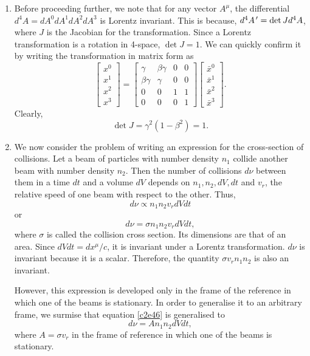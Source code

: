\begin{enumerate}
\item Before proceeding further, we note that for any vector $A^\mu$, the differential
$d^4A = dA^0dA^1dA^2dA^3$ is Lorentz invariant. This is because, $d^4A^{\,\prime} = 
\det J  d^4A$, where $J$ is the Jacobian for the transformation. Since a Lorentz
transformation is a rotation in 4-space, $\det J = 1$. We can quickly confirm it
by writing the transformation in matrix form as
\[
\begin{bmatrix}x^0 \\ x^1 \\ x^2 \\ x^3\end{bmatrix} = 
\begin{bmatrix} \gamma & \beta\gamma & 0 & 0 \\
\beta\gamma & \gamma & 0 & 0 \\
0 & 0 & 1 & 1 \\
0 & 0 & 0 & 1\end{bmatrix}
\begin{bmatrix}\bar{x}^0 \\ \bar{x}^1 \\ \bar{x}^2 \\ \bar{x}^3\end{bmatrix}.
\]
Clearly,
\[
\det J = \gamma^2(1 - \beta^2) = 1.
\]

\item We now consider the problem of writing an expression for the cross-section
of collisions. Let a beam of particles with number density $n_1$ collide another
beam with number density $n_2$. Then the number of collisions $d\nu$ between them
in a time $dt$ and a volume $dV$ depends on $n_1, n_2, dV, dt$ and $v_r$, the 
relative speed of one beam with respect to the other. Thus,
\[
d\nu \propto n_1n_2v_r dVdt
\]
or
\begin{equation}\label{c2e46}
d\nu = \sigma n_1n_2v_r dVdt,
\end{equation}
where $\sigma$ is called the collision cross section. Its dimensions are that of
an area. Since $dVdt = dx^\mu/c$, it is invariant under a Lorentz transformation. 
$d\nu$ is invariant because it is a scalar. Therefore, the quantity $\sigma v_r 
n_1n_2$ is also an invariant.

However, this expression is developed only in the frame of the reference in which
one of the beams is stationary. In order to generalise it to an arbitrary frame,
we surmise that equation \eqref{c2e46} is generalised to
\begin{equation}\label{c2e47}
d\nu = An_1n_2dVdt,
\end{equation}
where $A = \sigma v_r$ in the frame of reference in which one of the beams is
stationary. 


\end{enumerate}
